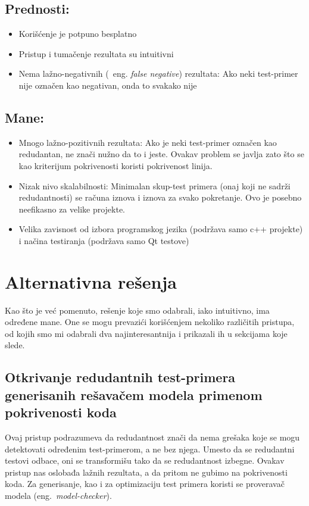 \documentclass[a4paper]{article}
\theoremstyle{definition}
\begin{document}
\subsection{Prednosti:}
\label{subsec:prednosti}
\begin{itemize}
    \item Korišćenje je potpuno besplatno
    \item Pristup i tumačenje rezultata su intuitivni
    \item Nema lažno-negativnih (~eng. \textit{false negative}) rezultata: Ako neki test-primer nije označen kao negativan, onda to svakako nije
\end{itemize}

\subsection{Mane:}
\label{subsec:mane}
\begin{itemize}
    \item Mnogo lažno-pozitivnih rezultata: Ako je neki test-primer označen kao redudantan, ne znači nužno da to i jeste. Ovakav problem se javlja zato što se kao kriterijum pokrivenosti koristi pokrivenost linija.
    \item Nizak nivo skalabilnosti: Minimalan skup-test primera (onaj koji ne sadrži redudantnosti) se računa iznova i iznova za svako pokretanje. Ovo je posebno neefikasno za velike projekte.
    \item Velika zavisnost od izbora programskog jezika (podržava samo c++ projekte) i načina testiranja (podržava samo Qt testove) 
\end{itemize}


\section{Alternativna rešenja}
\label{sec:alternative}

Kao što je već pomenuto, rešenje koje smo odabrali, iako intuitivno, ima određene mane. One se mogu prevazići korišćenjem nekoliko različitih pristupa, od kojih smo mi odabrali dva najinteresantnija i prikazali ih u sekcijama koje slede.

\subsection{Otkrivanje redudantnih test-primera generisanih rešavačem modela primenom pokrivenosti koda}
\label{subsec:prvi}

Ovaj pristup\cite{prvinacin} podrazumeva da redudantnost znači da nema grešaka koje se mogu detektovati određenim test-primerom, a ne bez njega. Umesto da se redudantni testovi odbace, oni se transformišu tako da se redudantnost izbegne. Ovakav pristup nas oslobađa lažnih rezultata, a da pritom ne gubimo na pokrivenosti koda. Za generisanje, kao i za optimizaciju test primera koristi se proveravač modela (eng.~{\em model-checker}).
\end{document}
